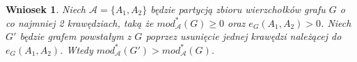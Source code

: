 \documentclass[letterpaper,12pt]{article}
\newtheorem{conclusion}{Wniosek}
\begin{document}
\begin{conclusion}
  Niech \(\mathcal{A}=\{A_1, A_2\}\) będzie partycją zbioru wierzchołków grafu \(G\) o co najmniej 2 krawędziach, taką że \(mod^*_{\mathcal{A}}(G) \geq 0\) oraz \(e_G(A_1, A_2) > 0\). Niech \(G'\) będzie grafem powstałym z \(G\) poprzez usunięcie jednej krawędzi należącej do \(e_G(A_1, A_2)\). Wtedy \(mod^*_{\mathcal{A}}(G') > mod^*_{\mathcal{A}}(G)\).\\
\end{conclusion}






\end{document}
